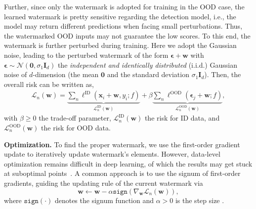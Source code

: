 \documentclass{article}
\begin{document}
Further, since only the watermark is adopted for training in the OOD case, the learned watermark is pretty sensitive regarding the detection model, i.e., the model may return different predictions when facing small perturbations. Thus, 
the watermarked OOD inputs may not guarantee the low scores. To this end, the watermark is further perturbed during training. Here we adopt the Gaussian noise, leading to the perturbed watermark of the form $\boldsymbol{\epsilon} + \boldsymbol{w}$ with $\boldsymbol{\epsilon}\sim\mathcal{N}(\boldsymbol{0},\sigma_1 \mathbf{I}_d)$  the \emph{independent and identically distributed} (i.i.d.) Gaussian noise of $d$-dimension (the mean $\boldsymbol{0}$ and the standard deviation $\sigma_1\mathbf{I}_d$). Then, the overall risk can be written as,
\begin{align}
    \mathcal{L}_n(\boldsymbol{w})=\underbrace{\sum_n \ell^\text{ID}(\boldsymbol{x}_i + \boldsymbol{w},y_i;f)}_{\mathcal{L}^\text{ID}_n(\boldsymbol{w})} + \beta \underbrace{\sum_n \ell^\text{OOD}(\boldsymbol{\epsilon}_j + \boldsymbol{w};f)}_{\mathcal{L}^\text{OOD}_n(\boldsymbol{w})}, \label{eq: objective}
\end{align}
with $\beta\ge 0$ the trade-off parameter, $\mathcal{L}^\text{ID}_n(\boldsymbol{w})$ the risk for ID data, and $\mathcal{L}^\text{OOD}_n(\boldsymbol{w})$ the risk for OOD data. 

                        

{\textbf{Optimization.} To find the proper watermark, we use the first-order gradient update to iteratively update watermark's elements. However, data-level optimization remains difficult in deep learning, of which the results may get stuck at suboptimal points~\cite{wang2021probabilistic}. A common approach is to use the signum of first-order gradients, guiding the updating rule of the current watermark via
\begin{equation}
    \boldsymbol{w}\leftarrow \boldsymbol{w}-\alpha \texttt{sign}(\nabla_{\boldsymbol{w}} \mathcal{L}_n(\boldsymbol{w})),
\end{equation}
where $\texttt{sign}(\cdot)$ denotes the signum function and $\alpha>0$ is the step size \cite{madry2017towards}. }
\end{document}

